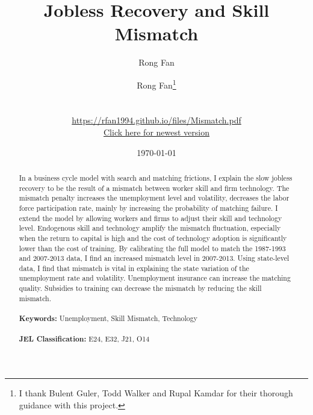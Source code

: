 \documentclass[12pt]{article}
\date{}
\author{Rong Fan}
\newcommand{\1}{\mathbb{1}}
\begin{document}
\begin{titlepage}
\title{Jobless Recovery and Skill Mismatch}
\author{Rong Fan\thanks{I thank Bulent Guler, Todd Walker and Rupal Kamdar for their thorough guidance with this project.} 
\\
\\
\\ \href{https://rfan1994.github.io/files/Mismatch.pdf}{https://rfan1994.github.io/files/Mismatch.pdf}
\\ \href{https://rfan1994.github.io/files/Mismatch.pdf}{Click here for newest version}}
\date{\today}
\maketitle

\begin{abstract}
\noindent In a business cycle model with search and matching frictions, I explain the slow jobless recovery to be the result of a mismatch between worker skill and firm technology. The mismatch penalty increases the unemployment level and volatility, decreases the labor force participation rate, mainly by increasing the probability of matching failure. I extend the model by allowing workers and firms to adjust their skill and technology level. Endogenous skill and technology amplify the mismatch fluctuation, especially when the return to capital is high and the cost of technology adoption is significantly lower than the cost of training. By calibrating the full model to match the 1987-1993 and 2007-2013 data, I find an increased mismatch level in 2007-2013. Using state-level data, I find that mismatch is vital in explaining the state variation of the unemployment rate and volatility. Unemployment insurance can increase the matching quality. Subsidies to training can decrease the mismatch by reducing the skill mismatch.  \\
\vspace{0in}\\
\noindent\textbf{Keywords:} Unemployment, Skill Mismatch, Technology\\
\vspace{0in}\\
\noindent\textbf{JEL Classification: } E24, E32, J21, O14\\

\bigskip
\end{abstract}
\setcounter{page}{0}
\thispagestyle{empty}
\end{titlepage}
\pagebreak \newpage
\end{document}
